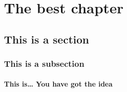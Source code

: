 \documentclass[a4paper,twoside,openright]{memoir}
\begin{document}



\chapter{The best chapter}

\section{This is a section}

\subsection{This is a subsection}

\subsubsection{This is\dots{} You have got the idea}

\lipsum[4-15]



\end{document}
